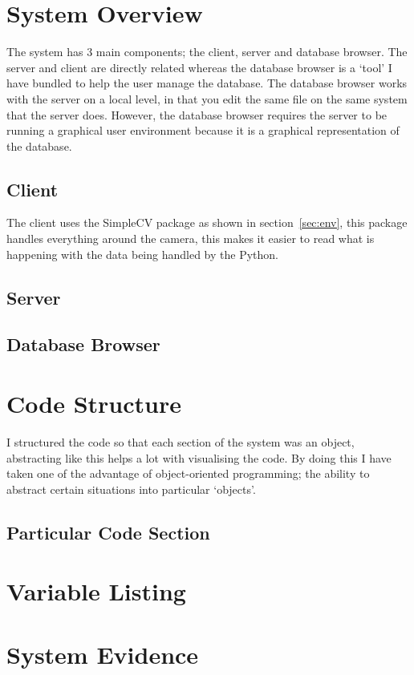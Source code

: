 \documentclass[a4paper]{article}
\begin{document}
\section{System Overview}
The system has 3 main components; the client, server and database browser. The server and client are directly related
whereas the database browser is a `tool' I have bundled to help the user manage the database. The database browser works
with the server on a local level, in that you edit the same file on the same system that the server does. However,
the database browser requires the server to be running a graphical user environment because it is a graphical representation
of the database. 

\subsection{Client}
The client uses the SimpleCV package as shown in section~\ref{sec:env}, this package handles everything around the camera,
this makes it easier to read what is happening with the data being handled by the Python.  

\subsection{Server}


\subsection{Database Browser}

\section{Code Structure}
I structured the code so that each section of the system was an object, abstracting like this helps a lot with
visualising the code. By doing this I have taken one of the advantage of object-oriented programming; the ability
to abstract certain situations into particular `objects'.

\subsection{Particular Code Section}
\section{Variable Listing}
\section{System Evidence}
\end{document}

